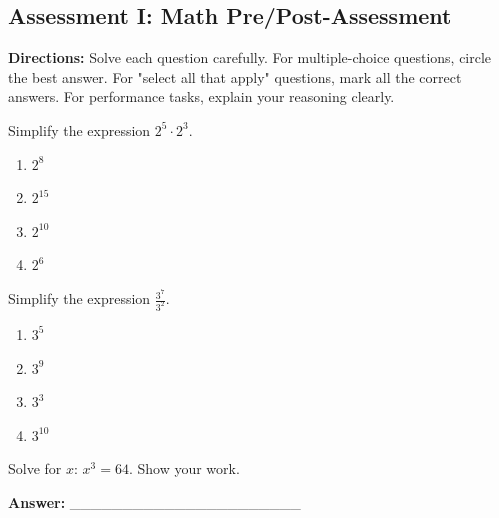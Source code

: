 \documentclass[12pt]{article}
\begin{document}
\subsection*{Assessment I: Math Pre/Post-Assessment}
\onehalfspacing

\begin{tcolorbox}[colframe=black!50, colback=white, title=Assessment Directions]
\textbf{Directions:} Solve each question carefully. For multiple-choice questions, circle the best answer. For "select all that apply" questions, mark all the correct answers. For performance tasks, explain your reasoning clearly.
\end{tcolorbox}

\begin{tcolorbox}[colframe=black!50, colback=white, title=\textbf{Problem 1 (8.EE.A.1)}]
Simplify the expression \(2^5 \cdot 2^3\).

\begin{enumerate}[label=(\Alph*)]
    \item \(2^8\)
    \item \(2^{15}\)
    \item \(2^{10}\)
    \item \(2^6\)
\end{enumerate}
\end{tcolorbox}

\begin{tcolorbox}[colframe=black!50, colback=white, title=\textbf{Problem 2 (8.EE.A.1)}]
Simplify the expression \(\frac{3^7}{3^2}\).

\begin{enumerate}[label=(\Alph*)]
    \item \(3^5\)
    \item \(3^9\)
    \item \(3^3\)
    \item \(3^{10}\)
\end{enumerate}
\end{tcolorbox}

\begin{tcolorbox}[colframe=black!50, colback=white, title=\textbf{Problem 3 (8.EE.A.2)}]
Solve for \(x\): \(x^3 = 64\). Show your work.

\vspace{3cm}
\textbf{Answer:} \_\_\_\_\_\_\_\_\_\_\_\_\_\_\_\_\_\_\_\_\_\_
\end{tcolorbox}
\end{document}
